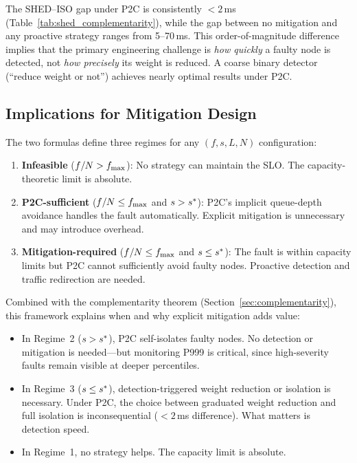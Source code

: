 \medskip

The SHED--ISO gap under P2C is consistently $< 2$\,ms
(Table~\ref{tab:shed_complementarity}), while the gap between no mitigation
and any proactive strategy ranges from 5--70\,ms. This order-of-magnitude
difference implies that the primary engineering challenge is \emph{how
quickly} a faulty node is detected, not \emph{how precisely} its weight is
reduced. A coarse binary detector (``reduce weight or not'') achieves
nearly optimal results under P2C.

\subsection{Implications for Mitigation Design}

The two formulas define three regimes for any $(f, s, L, N)$
configuration:

\begin{enumerate}
\item \textbf{Infeasible} ($f/N > f_{\max}$): No strategy can maintain the
  SLO. The capacity-theoretic limit is absolute.
\item \textbf{P2C-sufficient} ($f/N \leq f_{\max}$ and $s > s^{*}$):
  P2C's implicit queue-depth avoidance handles the fault automatically.
  Explicit mitigation is unnecessary and may introduce overhead.
\item \textbf{Mitigation-required} ($f/N \leq f_{\max}$ and $s \leq
  s^{*}$): The fault is within capacity limits but P2C cannot
  sufficiently avoid faulty nodes. Proactive detection and traffic
  redirection are needed.
\end{enumerate}

Combined with the complementarity theorem (Section~\ref{sec:complementarity}),
this framework explains when and why explicit mitigation adds value:
\begin{itemize}
\item In Regime~2 ($s > s^{*}$), P2C self-isolates faulty nodes. No
  detection or mitigation is needed---but monitoring P999 is critical,
  since high-severity faults remain visible at deeper percentiles.
\item In Regime~3 ($s \leq s^{*}$), detection-triggered weight reduction
  or isolation is necessary. Under P2C, the choice between graduated
  weight reduction and full isolation is inconsequential ($< 2$\,ms
  difference). What matters is detection speed.
\item In Regime~1, no strategy helps. The capacity limit is absolute.
\end{itemize}
